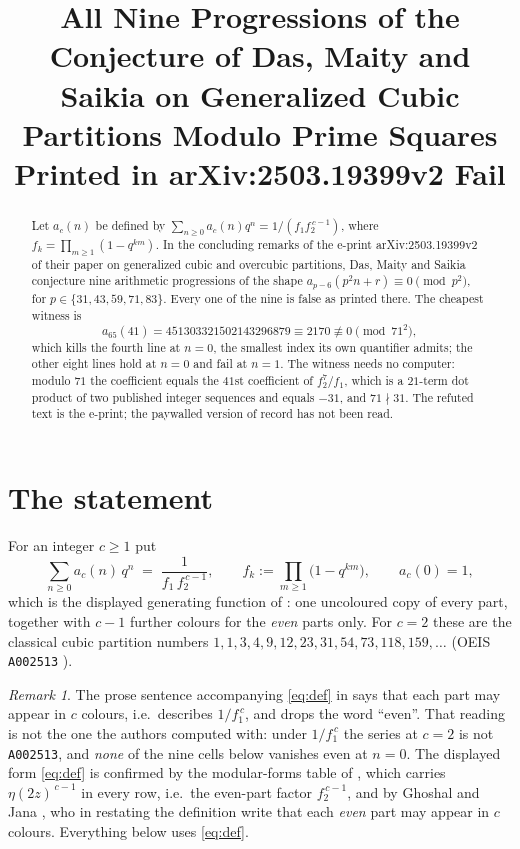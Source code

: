 \documentclass[11pt]{amsart}
\title[Nine progressions conjectured in arXiv:2503.19399v2 fail]
{All Nine Progressions of the Conjecture of Das, Maity and Saikia on
 Generalized Cubic Partitions Modulo Prime Squares Printed in
 arXiv:2503.19399v2 Fail}
\date{}
\theoremstyle{definition}
\theoremstyle{remark}
\newtheorem*{remark}{Remark}
\begin{document}
\begin{abstract}
Let $a_c(n)$ be defined by $\sum_{n\ge0}a_c(n)q^n=1/(f_1f_2^{\,c-1})$, where
$f_k=\prod_{m\ge1}(1-q^{km})$. In the concluding remarks of the e-print
arXiv:2503.19399v2 of their paper on generalized cubic and overcubic partitions, Das,
Maity and Saikia conjecture nine arithmetic progressions of the shape
$a_{p-6}(p^2n+r)\equiv0\pmod{p^2}$, for $p\in\{31,43,59,71,83\}$. Every one of the nine
is false as printed there. The cheapest witness is
\[
 a_{65}(41)=451303321502143296879\equiv 2170\not\equiv 0 \pmod{71^2},
\]
which kills the fourth line at $n=0$, the smallest index its own quantifier admits; the
other eight lines hold at $n=0$ and fail at $n=1$. The witness needs no computer: modulo
$71$ the coefficient equals the $41$st coefficient of $f_2^{7}/f_1$, which is a $21$-term
dot product of two published integer sequences and equals $-31$, and $71\nmid31$. The
refuted text is the e-print; the paywalled version of record has not been read.
\end{abstract}

\maketitle

\section{The statement}

For an integer $c\ge1$ put
\begin{equation}\label{eq:def}
 \sum_{n\ge0}a_c(n)\,q^n \;=\; \frac{1}{f_1\,f_2^{\,c-1}},
 \qquad f_k:=\prod_{m\ge1}\bigl(1-q^{km}\bigr),\qquad a_c(0)=1 ,
\end{equation}
which is the displayed generating function of \cite{DMS}: one uncoloured copy
of every part, together with $c-1$ further colours for the \emph{even} parts only. For
$c=2$ these are the classical cubic partition numbers
$1,1,3,4,9,12,23,31,54,73,118,159,\dots$ (OEIS \texttt{A002513} \cite{A002513}).

\begin{remark}\label{rem:prose}
The prose sentence accompanying \eqref{eq:def} in \cite{DMS} says that each part may
appear in $c$ colours, i.e.\ describes $1/f_1^{\,c}$, and drops the word ``even''. That
reading is not the one the authors computed with: under $1/f_1^{\,c}$ the series at $c=2$
is not \texttt{A002513}, and \emph{none} of the nine cells below vanishes even at $n=0$.
The displayed form \eqref{eq:def} is confirmed by the modular-forms table of \cite{DMS},
which carries $\eta(2z)^{\,c-1}$ in every row, i.e.\ the even-part factor
$f_2^{\,c-1}$, and by Ghoshal and Jana \cite{GJ}, who in restating the definition write
that each \emph{even} part may appear in $c$ colours. Everything below uses
\eqref{eq:def}.
\end{remark}
\end{document}
